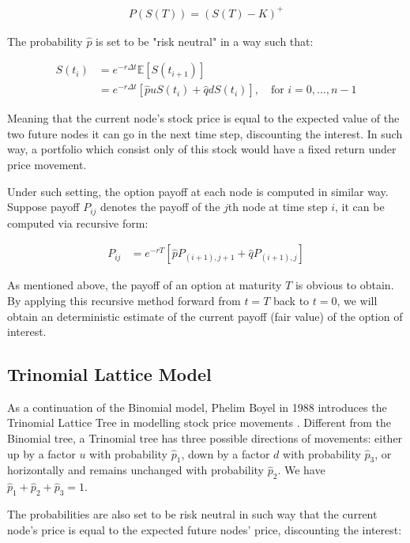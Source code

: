 \begin{align}
P(S(T))=(S(T)-K)^+
\end{align}

The probability $\hat{p}$ is set to be "risk neutral" in a way such that:

\begin{align}
S(t_{i}) &= e^{-r\Delta t}\mathbb{E}[S(t_{i+1})] \\
		 &= e^{-r\Delta t}[\hat{p}uS(t_i)+\hat{q}dS(t_i)],\quad\text{for }i=0,...,n-1
\end{align}

Meaning that the current node's stock price is equal to the expected value of the two future nodes it can go in the next time step, discounting the interest. In such way, a portfolio which consist only of this stock would have a fixed return under price movement.

Under such setting, the option payoff at each node is computed in similar way. Suppose payoff $P_{ij}$ denotes the payoff of the $j$th node at time step $i$, it can be computed via recursive form:

\begin{align}
P_{ij} &= e^{-rT}[\hat{p}P_{(i+1),j+1} + \hat{q}P_{(i+1),j}]
\end{align}

As mentioned above, the payoff of an option at maturity $T$ is obvious to obtain. By applying this recursive method forward from $t=T$ back to $t=0$, we will obtain an deterministic estimate of the current payoff (fair value) of the option of interest.

\subsection{Trinomial Lattice Model}

As a continuation of the Binomial model, Phelim Boyel in 1988 introduces the Trinomial Lattice Tree in modelling stock price movements \cite{Boyle1988}. Different from the Binomial tree, a Trinomial tree has three possible directions of movements: either up by a factor $u$ with probability $\hat{p}_1$, down by a factor $d$ with probability $\hat{p}_3$, or horizontally and remains unchanged with probability $\hat{p}_2$. We have $\hat{p}_1 + \hat{p}_2 + \hat{p}_3=1$.


The probabilities are also set to be risk neutral in such way that the current node's price is equal to the expected future nodes' price, discounting the interest:

